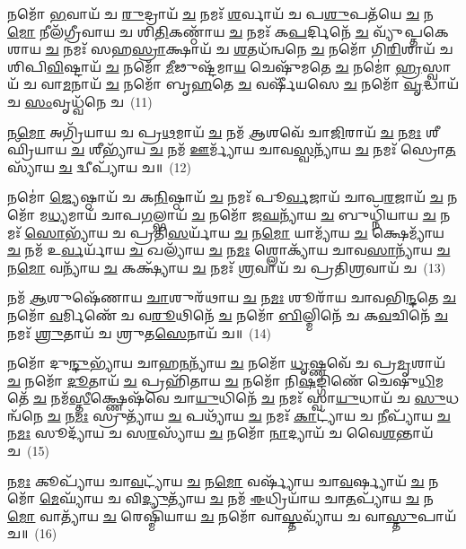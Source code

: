 {\anuvakamend[{𑌰𑌥𑍇॑\-\ul{𑌭𑍍𑌯𑌃} 𑌶𑍍𑌵𑌪᳴𑌤𑌿𑌭𑍍𑌯\-\ul{𑌶𑍍𑌚} 𑌦𑍍𑌵𑍇 𑌚᳴}]}%

𑌨𑌮𑍋᳴ \ul{𑌭}\-𑌵𑌾𑌯᳴ 𑌚 \ul{𑌰𑍁}\-𑌦𑍍𑌰𑌾𑌯᳴ \ul{𑌚} 𑌨𑌮𑌃᳴ \ul{𑌶}\-𑌰𑍍𑌵𑌾𑌯᳴ 𑌚 𑌪\-\ul{𑌶𑍁}\-𑌪𑌤᳴𑌯𑍇 \ul{𑌚} 𑌨\-\ul{𑌮𑍋} 𑌨𑍀𑌲᳴𑌗𑍍𑌰𑍀𑌵𑌾𑌯 𑌚 𑌶𑌿\-\ul{𑌤𑌿}\-𑌕𑌣𑍍𑌠𑌾᳴𑌯 \ul{𑌚} 𑌨𑌮𑌃᳴ 𑌕\-\ul{𑌪}\-𑌰𑍍𑌦𑌿𑌨𑍇᳴ \ul{𑌚} 𑌵𑍍𑌯𑍁᳴𑌪𑍍𑌤𑌕𑍇𑌶𑌾𑌯 \ul{𑌚} 𑌨𑌮𑌃᳴ 𑌸𑌹\-\ul{𑌸𑍍𑌰𑌾}\-𑌕𑍍𑌷𑌾𑌯᳴ 𑌚 \ul{𑌶}\-𑌤𑌧᳴𑌨𑍍𑌵𑌨𑍇 \ul{𑌚} 𑌨𑌮𑍋᳴ 𑌗𑌿\-\ul{𑌰𑌿}\-𑌶𑌾𑌯᳴ 𑌚 𑌶𑌿𑌪𑌿\-\ul{𑌵𑌿}\-𑌷𑍍𑌟𑌾𑌯᳴ \ul{𑌚} 𑌨𑌮𑍋᳴ \ul{𑌮𑍀}\-𑌢𑍁𑌷𑍍𑌟᳴𑌮𑌾\-\ul{𑌯} 𑌚𑍇𑌷𑍁᳴𑌮𑌤𑍇 \ul{𑌚} 𑌨𑌮𑍋॑ \ul{𑌹𑍍𑌰}\-𑌸𑍍𑌵𑌾𑌯᳴ 𑌚 𑌵𑌾\-\ul{𑌮}\-𑌨𑌾𑌯᳴ \ul{𑌚} 𑌨𑌮𑍋᳴ 𑌬𑍃\-\ul{𑌹}\-𑌤𑍇 \ul{𑌚} 𑌵𑌰𑍍\mbox{}𑌷𑍀᳴𑌯𑌸𑍇 \ul{𑌚} 𑌨𑌮𑍋᳴ \ul{𑌵𑍃}\-𑌦𑍍𑌧𑌾𑌯᳴ 𑌚 \ul{𑌸𑌂}\-𑌵𑍃𑌧𑍍𑌵᳴𑌨𑍇 𑌚~(11)

𑌨\-\ul{𑌮𑍋} 𑌅𑌗𑍍𑌰𑌿᳴𑌯𑌾𑌯 𑌚 𑌪𑍍𑌰\-\ul{𑌥}\-𑌮𑌾𑌯᳴ \ul{𑌚} 𑌨𑌮᳴ \ul{𑌆}\-𑌶𑌵𑍇᳴ 𑌚𑌾\-\ul{𑌜𑌿}\-𑌰𑌾𑌯᳴ \ul{𑌚} 𑌨\-\ul{𑌮𑌃} 𑌶𑍀𑌘𑍍𑌰𑌿᳴𑌯𑌾𑌯 \ul{𑌚} 𑌶𑍀𑌭𑍍𑌯𑌾᳴𑌯 \ul{𑌚} 𑌨𑌮᳴ \ul{𑌊}\-𑌰𑍍𑌮𑍍𑌯𑌾᳴𑌯 𑌚𑌾𑌵\-\ul{𑌸𑍍𑌵}\-𑌨𑍍𑌯𑌾᳴𑌯 \ul{𑌚} 𑌨𑌮𑌃᳴ 𑌸𑍍𑌰𑍋\-\ul{𑌤}\-𑌸𑍍𑌯𑌾᳴𑌯 \ul{𑌚} 𑌦𑍍𑌵𑍀𑌪𑍍𑌯𑌾᳴𑌯 𑌚॥~(12)

{\anuvakamend[{\-\ul{𑌸𑌂} 𑌵𑍃𑌧𑍍𑌵᳴𑌨𑍇 \ul{𑌚} 𑌪𑌞𑍍𑌚᳴𑌵𑌿𑍞𑌶𑌤𑌿𑌶𑍍𑌚}]}%

𑌨𑌮𑍋॑ \ul{𑌜𑍍𑌯𑍇}\-𑌷𑍍𑌠𑌾𑌯᳴ 𑌚 𑌕\-\ul{𑌨𑌿}\-𑌷𑍍𑌠𑌾𑌯᳴ \ul{𑌚} 𑌨𑌮𑌃᳴ 𑌪𑍂\-\ul{𑌰𑍍𑌵}\-𑌜𑌾𑌯᳴ 𑌚𑌾𑌪\-\ul{𑌰}\-𑌜𑌾𑌯᳴ \ul{𑌚} 𑌨𑌮𑍋᳴ 𑌮\-\ul{𑌧𑍍𑌯}\-𑌮𑌾𑌯᳴ 𑌚𑌾𑌪\-\ul{𑌗}\-𑌲𑍍𑌭𑌾𑌯᳴ \ul{𑌚} 𑌨𑌮𑍋᳴ 𑌜\-\ul{𑌘}\-𑌨𑍍𑌯𑌾᳴𑌯 \ul{𑌚} 𑌬𑍁𑌧𑍍𑌨𑌿᳴𑌯𑌾𑌯 \ul{𑌚} 𑌨𑌮𑌃᳴ \ul{𑌸𑍋}\-𑌭𑍍𑌯𑌾᳴𑌯 𑌚 𑌪𑍍𑌰𑌤𑌿\-\ul{𑌸}\-𑌰𑍍𑌯𑌾᳴𑌯 \ul{𑌚} 𑌨\-\ul{𑌮𑍋} 𑌯𑌾𑌮𑍍𑌯𑌾᳴𑌯 \ul{𑌚} 𑌕𑍍𑌷𑍇𑌮𑍍𑌯𑌾᳴𑌯 \ul{𑌚} 𑌨𑌮᳴ 𑌉\-\ul{𑌰𑍍𑌵}\-𑌰𑍍𑌯𑌾᳴𑌯 \ul{𑌚} 𑌖𑌲𑍍𑌯𑌾᳴𑌯 \ul{𑌚} 𑌨\-\ul{𑌮𑌃} 𑌶𑍍𑌲𑍋𑌕𑍍𑌯𑌾᳴𑌯 𑌚𑌾𑌵\-\ul{𑌸𑌾}\-𑌨𑍍𑌯𑌾᳴𑌯 \ul{𑌚} 𑌨\-\ul{𑌮𑍋} 𑌵𑌨𑍍𑌯𑌾᳴𑌯 \ul{𑌚} 𑌕𑌕𑍍𑌷𑍍𑌯𑌾᳴𑌯 \ul{𑌚} 𑌨𑌮𑌃᳴ \ul{𑌶𑍍𑌰}\-𑌵𑌾𑌯᳴ 𑌚 𑌪𑍍𑌰𑌤𑌿\-\ul{𑌶𑍍𑌰}\-𑌵𑌾𑌯᳴ 𑌚~(13)

𑌨𑌮᳴ \ul{𑌆}\-𑌶𑍁𑌷𑍇᳴𑌣𑌾𑌯 \ul{𑌚𑌾}\-𑌶𑍁𑌰᳴𑌥𑌾𑌯 \ul{𑌚} 𑌨\-\ul{𑌮𑌃} 𑌶𑍂𑌰𑌾᳴𑌯 𑌚𑌾𑌵𑌭𑌿\-\ul{𑌨𑍍𑌦}\-𑌤𑍇 \ul{𑌚} 𑌨𑌮𑍋᳴ \ul{𑌵}\-𑌰𑍍𑌮𑌿𑌣𑍇᳴ 𑌚 𑌵\-\ul{𑌰𑍂}\-𑌥𑌿𑌨𑍇᳴ \ul{𑌚} 𑌨𑌮𑍋᳴ \ul{𑌬𑌿}\-𑌲𑍍𑌮𑌿𑌨𑍇᳴ 𑌚 𑌕\-\ul{𑌵}\-𑌚𑌿𑌨𑍇᳴ \ul{𑌚} 𑌨𑌮𑌃᳴ \ul{𑌶𑍍𑌰𑍁}\-𑌤𑌾𑌯᳴ 𑌚 𑌶𑍍𑌰𑍁𑌤\-\ul{𑌸𑍇}\-𑌨𑌾𑌯᳴ 𑌚॥~(14)

{\anuvakamend[{\-\ul{𑌪𑍍𑌰}\-\-\ul{𑌤𑌿}\-\-\ul{𑌶𑍍𑌰}\-𑌵𑌾𑌯᳴ \ul{𑌚} 𑌪𑌞𑍍𑌚᳴𑌵𑌿𑍞𑌶𑌤𑌿𑌶𑍍𑌚}]}%

𑌨𑌮𑍋᳴ 𑌦𑍁\-\ul{𑌨𑍍𑌦𑍁}\-𑌭𑍍𑌯𑌾᳴𑌯 𑌚𑌾𑌹\-\ul{𑌨}\-𑌨𑍍𑌯𑌾᳴𑌯 \ul{𑌚} 𑌨𑌮𑍋᳴ \ul{𑌧𑍃}\-𑌷𑍍𑌣𑌵𑍇᳴ 𑌚 𑌪𑍍𑌰\-\ul{𑌮𑍃}\-𑌶𑌾𑌯᳴ \ul{𑌚} 𑌨𑌮𑍋᳴ \ul{𑌦𑍂}\-𑌤𑌾𑌯᳴ \ul{𑌚} 𑌪𑍍𑌰𑌹𑌿᳴𑌤𑌾𑌯 \ul{𑌚} 𑌨𑌮𑍋᳴ 𑌨𑌿\-\ul{𑌷}\-𑌙𑍍𑌗𑌿𑌣𑍇᳴ 𑌚𑍇𑌷𑍁\-\ul{𑌧𑌿}\-𑌮𑌤𑍇᳴ \ul{𑌚} 𑌨𑌮᳴\-\ul{𑌸𑍍𑌤𑍀}\-𑌕𑍍𑌷𑍍𑌣𑍇𑌷᳴𑌵𑍇 𑌚𑌾\-\ul{𑌯𑍁}\-𑌧𑌿𑌨𑍇᳴ \ul{𑌚} 𑌨𑌮𑌃᳴ 𑌸𑍍𑌵𑌾\-\ul{𑌯𑍁}\-𑌧𑌾𑌯᳴ 𑌚 \ul{𑌸𑍁}\-𑌧𑌨𑍍𑌵᳴𑌨𑍇 \ul{𑌚} 𑌨\-\ul{𑌮𑌃} 𑌸𑍍𑌰𑍁𑌤𑍍𑌯𑌾᳴𑌯 \ul{𑌚} 𑌪𑌥𑍍𑌯𑌾᳴𑌯 \ul{𑌚} 𑌨𑌮𑌃᳴ \ul{𑌕𑌾}\-𑌟𑍍𑌯𑌾᳴𑌯 𑌚 \ul{𑌨𑍀}\-𑌪𑍍𑌯𑌾᳴𑌯 \ul{𑌚} 𑌨\-\ul{𑌮𑌃} 𑌸𑍂𑌦𑍍𑌯𑌾᳴𑌯 𑌚 𑌸\-\ul{𑌰}\-𑌸𑍍𑌯𑌾᳴𑌯 \ul{𑌚} 𑌨𑌮𑍋᳴ \ul{𑌨𑌾}\-𑌦𑍍𑌯𑌾𑌯᳴ 𑌚 𑌵𑍈\-\ul{𑌶}\-𑌨𑍍𑌤𑌾𑌯᳴ 𑌚~(15)

𑌨\-\ul{𑌮𑌃} 𑌕𑍂𑌪𑍍𑌯𑌾᳴𑌯 𑌚𑌾\-\ul{𑌵}\-𑌟𑍍𑌯𑌾᳴𑌯 \ul{𑌚} 𑌨\-\ul{𑌮𑍋} 𑌵𑌰𑍍𑌷𑍍𑌯𑌾᳴𑌯 𑌚𑌾\-\ul{𑌵}\-𑌰𑍍𑌷𑍍𑌯𑌾𑌯᳴ \ul{𑌚} 𑌨𑌮𑍋᳴ \ul{𑌮𑍇}\-𑌘𑍍𑌯𑌾᳴𑌯 𑌚 𑌵𑌿\-\ul{𑌦𑍍𑌯𑍁}\-𑌤𑍍𑌯𑌾᳴𑌯 \ul{𑌚} 𑌨𑌮᳴ \ul{𑌈}\-𑌧𑍍𑌰𑌿𑌯𑌾᳴𑌯 𑌚𑌾\-\ul{𑌤}\-𑌪𑍍𑌯𑌾᳴𑌯 \ul{𑌚} 𑌨\-\ul{𑌮𑍋} 𑌵𑌾𑌤𑍍𑌯𑌾᳴𑌯 \ul{𑌚} 𑌰𑍇𑌷𑍍𑌮𑌿᳴𑌯𑌾𑌯 \ul{𑌚} 𑌨𑌮𑍋᳴ 𑌵𑌾\-\ul{𑌸𑍍𑌤}\-𑌵𑍍𑌯𑌾᳴𑌯 𑌚 𑌵𑌾\-\ul{𑌸𑍍𑌤𑍁}\-𑌪𑌾𑌯᳴ 𑌚॥~(16)

